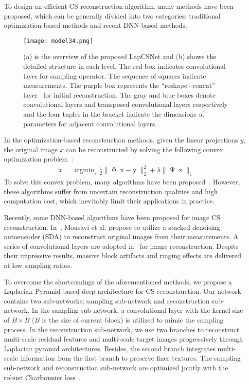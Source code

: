 \documentclass{article}
\DeclareMathOperator*{\argmin}{argmin}
\begin{document}
To design an efficient CS reconstruction algorithm, many methods have been proposed, which can be generally divided into two categories: traditional optimization-based methods and recent DNN-based methods.

\begin{figure*}[!t]
\centering
\texttt{[image: model34.png]}
\caption{(a) is the overview of the proposed LapCSNet and (b) shows the detailed structure in each level. The red box indicates convolutional layer for sampling operator. The sequence of squares indicate measurements. The purple box represents the ``reshape+concat'' layer~\cite{shi2017deep} for initial reconstruction. The gray and blue boxes denote convolutional layers and transposed convolutional layers respectively and the four tuples in the bracket indicate the dimensions of parameters for adjacent convolutional layers.}
\label{figure1}
\end{figure*}



In the optimization-based reconstruction methods, given the linear projections $y$, the original image $x$ can be reconstructed by solving the following convex optimization problem~\cite{candes2006robust, donoho2006compressed}:
\begin{eqnarray}
\tilde{x} = \mathop{\argmin}_{\mathop{x}}{\frac{1}{2}\|\mathop{\Phi}\mathop{x} - \mathop{y}\|_2^{2}+\lambda\|\mathop{\Psi}\mathop{x}\|_1}
\end{eqnarray}
To solve this convex problem, many algorithms have been proposed~\cite{chen2001atomic, li1tval3, zhang2014group}. However, these algorithms suffer from uncertain reconstruction qualities and high computation cost, which inevitably limit their applications in practice.

Recently, some DNN-based algorithms have been proposed for image CS reconstruction. In~\cite{mousavi2015deep}, Mousavi et al. propose to utilize a stacked denoising autoencoder (SDA) to reconstruct original images from their measurements. A series of convolutional layers are adopted in~\cite{kulkarni2016reconnet,adler2016deep,shi2017deep} for image reconstruction. Despite their impressive results, massive block artifacts and ringing effects are delivered at low sampling ratios.

To overcome the shortcomings of the aforementioned methods, we propose a Laplacian Pyramid based deep architecture for CS reconstruction. Our network contains two sub-networks: sampling sub-network and reconstruction sub-network. In the sampling sub-network, a convolutional layer with the kernel size of $B\times B$ ($B$ is the size of current block) is utilized to mimic the sampling process. In the reconstruction sub-network, we use two branches to reconstruct multi-scale residual features and multi-scale target images progressively through Laplacian pyramid architectures. Besides, the second branch integrates multi-scale information from the first branch to preserve finer textures. The sampling sub-network and reconstruction sub-network are optimized jointly with the robust Charbonnier loss~\cite{bruhn2005lucas}.
\end{document}

